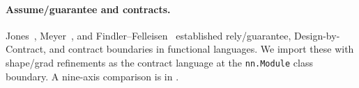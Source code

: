\paragraph{Assume/guarantee and contracts.}
Jones~\citep{jones1983tentative},
Meyer~\citep{meyer1992applying}, and
Findler--Felleisen~\citep{findler2002contracts} established
rely/guarantee, Design-by-Contract, and contract boundaries in
functional languages. We import these with shape/grad
refinements as the contract language at the
\texttt{nn.Module} class boundary. A nine-axis comparison is in
.
